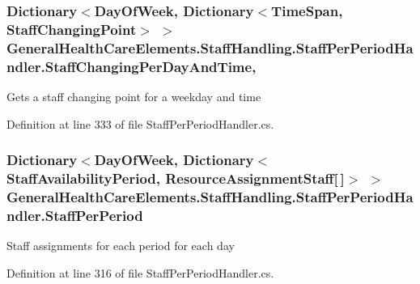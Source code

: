 \subsubsection[{\texorpdfstring{Staff\+Changing\+Per\+Day\+And\+Time}{StaffChangingPerDayAndTime}}]{\setlength{\rightskip}{0pt plus 5cm}Dictionary$<$Day\+Of\+Week, Dictionary$<$Time\+Span, {\bf Staff\+Changing\+Point}$>$ $>$ General\+Health\+Care\+Elements.\+Staff\+Handling.\+Staff\+Per\+Period\+Handler.\+Staff\+Changing\+Per\+Day\+And\+Time\hspace{0.3cm}{\ttfamily [get]}, {\ttfamily [set]}}\hypertarget{class_general_health_care_elements_1_1_staff_handling_1_1_staff_per_period_handler_a03a7e591510f8dbe271e0421b14950c9}{}\label{class_general_health_care_elements_1_1_staff_handling_1_1_staff_per_period_handler_a03a7e591510f8dbe271e0421b14950c9}


Gets a staff changing point for a weekday and time 



Definition at line 333 of file Staff\+Per\+Period\+Handler.\+cs.

\subsubsection[{\texorpdfstring{Staff\+Per\+Period}{StaffPerPeriod}}]{\setlength{\rightskip}{0pt plus 5cm}Dictionary$<$Day\+Of\+Week, Dictionary$<${\bf Staff\+Availability\+Period}, {\bf Resource\+Assignment\+Staff}\mbox{[}$\,$\mbox{]}$>$ $>$ General\+Health\+Care\+Elements.\+Staff\+Handling.\+Staff\+Per\+Period\+Handler.\+Staff\+Per\+Period\hspace{0.3cm}{\ttfamily [get]}}\hypertarget{class_general_health_care_elements_1_1_staff_handling_1_1_staff_per_period_handler_a1e182d4bee555f86e6ca8e35ab6bc285}{}\label{class_general_health_care_elements_1_1_staff_handling_1_1_staff_per_period_handler_a1e182d4bee555f86e6ca8e35ab6bc285}


Staff assignments for each period for each day 



Definition at line 316 of file Staff\+Per\+Period\+Handler.\+cs.

